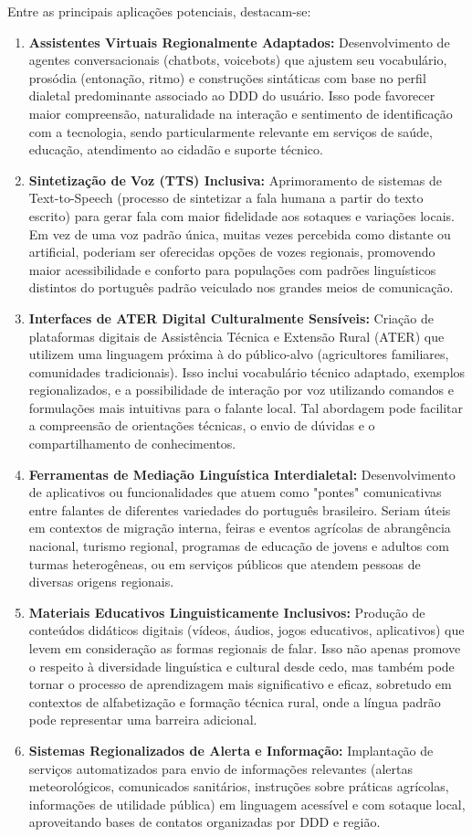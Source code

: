 Entre as principais aplicações potenciais, destacam-se:
\begin{enumerate}
    \item \textbf{Assistentes Virtuais Regionalmente Adaptados:} Desenvolvimento de agentes conversacionais (chatbots, voicebots) que ajustem seu vocabulário, prosódia (entonação, ritmo) e construções sintáticas com base no perfil dialetal predominante associado ao DDD do usuário. Isso pode favorecer maior compreensão, naturalidade na interação e sentimento de identificação com a tecnologia, sendo particularmente relevante em serviços de saúde, educação, atendimento ao cidadão e suporte técnico.
    \item \textbf{Sintetização de Voz (TTS) Inclusiva:} Aprimoramento de sistemas de Text-to-Speech (processo de sintetizar a fala humana a partir do texto escrito) para gerar fala com maior fidelidade aos sotaques e variações locais. Em vez de uma voz padrão única, muitas vezes percebida como distante ou artificial, poderiam ser oferecidas opções de vozes regionais, promovendo maior acessibilidade e conforto para populações com padrões linguísticos distintos do português padrão veiculado nos grandes meios de comunicação.
    \item \textbf{Interfaces de ATER Digital Culturalmente Sensíveis:} Criação de plataformas digitais de Assistência Técnica e Extensão Rural (ATER) que utilizem uma linguagem próxima à do público-alvo (agricultores familiares, comunidades tradicionais). Isso inclui vocabulário técnico adaptado, exemplos regionalizados, e a possibilidade de interação por voz utilizando comandos e formulações mais intuitivas para o falante local. Tal abordagem pode facilitar a compreensão de orientações técnicas, o envio de dúvidas e o compartilhamento de conhecimentos.
    \item \textbf{Ferramentas de Mediação Linguística Interdialetal:} Desenvolvimento de aplicativos ou funcionalidades que atuem como "pontes" comunicativas entre falantes de diferentes variedades do português brasileiro. Seriam úteis em contextos de migração interna, feiras e eventos agrícolas de abrangência nacional, turismo regional, programas de educação de jovens e adultos com turmas heterogêneas, ou em serviços públicos que atendem pessoas de diversas origens regionais.
    \item \textbf{Materiais Educativos Linguisticamente Inclusivos:} Produção de conteúdos didáticos digitais (vídeos, áudios, jogos educativos, aplicativos) que levem em consideração as formas regionais de falar. Isso não apenas promove o respeito à diversidade linguística e cultural desde cedo, mas também pode tornar o processo de aprendizagem mais significativo e eficaz, sobretudo em contextos de alfabetização e formação técnica rural, onde a língua padrão pode representar uma barreira adicional.
    \item \textbf{Sistemas Regionalizados de Alerta e Informação:} Implantação de serviços automatizados para envio de informações relevantes (alertas meteorológicos, comunicados sanitários, instruções sobre práticas agrícolas, informações de utilidade pública) em linguagem acessível e com sotaque local, aproveitando bases de contatos organizadas por DDD e região.
\end{enumerate}

